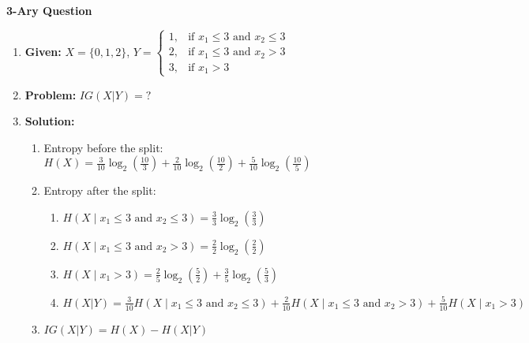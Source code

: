 \begin{example} \textbf{3-Ary Question}
    \begin{enumerate}
        \item \textbf{Given:} $X= \{0,1,2\}$, $Y = \begin{cases}
        1, & \text{if } x_1 \leq 3 \text{ and } x_2 \leq 3 \\
        2, & \text{if } x_1 \leq 3 \text{ and } x_2 > 3 \\
        3, & \text{if } x_1 > 3 
        \end{cases}$
        \item \textbf{Problem:} $IG(X|Y) = ?$
        \item \textbf{Solution:}
        \begin{enumerate}
            \item Entropy before the split: $H(X) = \frac{3}{10} \log_2\left(\frac{10}{3}\right) + \frac{2}{10} \log_2\left(\frac{10}{2}\right) + \frac{5}{10} \log_2\left(\frac{10}{5}\right)$
            \item Entropy after the split:
            \begin{enumerate}
                \item $H(X \mid x_1 \leq 3 \text{ and } x_2 \leq 3) = \frac{3}{3} \log_2\left(\frac{3}{3}\right)$
                \item $H(X \mid x_1 \leq 3 \text{ and } x_2 > 3) = \frac{2}{2} \log_2\left(\frac{2}{2}\right)$
                \item $H(X \mid x_1 > 3) = \frac{2}{5} \log_2\left(\frac{5}{2}\right) + \frac{3}{5} \log_2\left(\frac{5}{3}\right)$
                \item $H(X|Y) = \frac{3}{10} H(X \mid x_1 \leq 3 \text{ and } x_2 \leq 3) + \frac{2}{10} H(X \mid x_1 \leq 3 \text{ and } x_2 > 3) + \frac{5}{10} H(X \mid x_1 > 3)$
            \end{enumerate}
            \item $IG(X|Y) = H(X) - H(X|Y)$
        \end{enumerate}
    \end{enumerate}
\end{example}
\newpage

